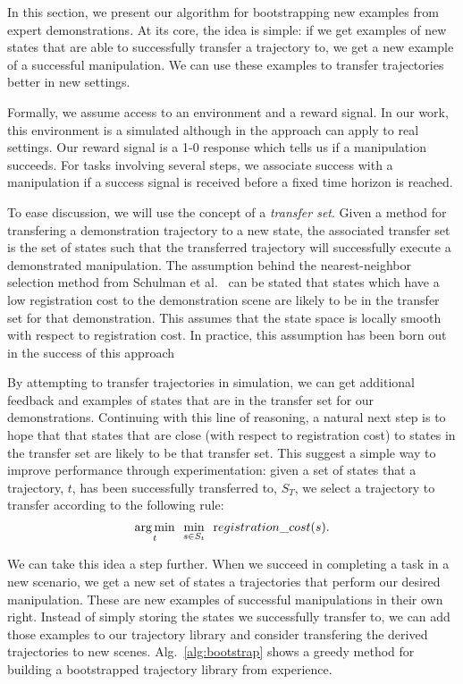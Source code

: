 In this section, we present our algorithm for bootstrapping new examples 
from expert demonstrations. At its core, the idea is simple: if we get
examples of new states that are able to successfully transfer a trajectory to,
we get a new example of a successful manipulation. We can use these examples
to transfer trajectories better in new settings.

Formally, we assume access to an environment and a reward signal. In our work, this
environment is a simulated although in the approach can apply to real settings. 
Our reward signal is a 1-0 response which tells us if a manipulation succeeds. For 
tasks involving several steps, we associate success with a manipulation if a success
signal is received before a fixed time horizon is reached.

To ease discussion, we will use the concept of a \emph{transfer set}. Given a method for
transfering a demonstration trajectory to a new state, the associated transfer set is
the set of states such that the transferred trajectory will successfully execute a
demonstrated manipulation. The assumption behind the nearest-neighbor selection
method from Schulman et al.~\cite{Schulmanetal_ISRR2013} can be stated that states
which have a low registration cost to the demonstration scene are likely to be in the
transfer set for that demonstration. This assumes that the state space is locally
smooth with respect to registration cost. In practice, this assumption has been
born out in the success of this approach

By attempting to transfer trajectories in simulation, we can get additional feedback
and examples of states that are in the transfer set for our demonstrations.
Continuing with this line of reasoning, a natural next step is to hope that that
states that are close (with respect to registration cost) to states in the transfer
set are likely to be that transfer set. This suggest a simple way to improve performance
through experimentation: given a set of
states that a trajectory, $t$,  has been successfully transferred to, $S_T$,
we select a trajectory to transfer according to the following rule:
\begin{equation}
\underset{t}{\operatorname*{arg\,min}} \ \ \underset{s\in S_t}{\min} \ \ {\text registration\_cost}(s).
\end{equation}

We can take this idea a step further. When we succeed in completing a task in a new
scenario, we get a new set of states a trajectories that perform our desired manipulation.
These are new examples of successful manipulations in their own right. Instead of simply storing
the states we successfully transfer to, we can add those examples to our trajectory 
library and consider transfering the derived trajectories to new scenes. 
Alg.~\ref{alg:bootstrap} shows a greedy method for building a bootstrapped trajectory
library from experience.

